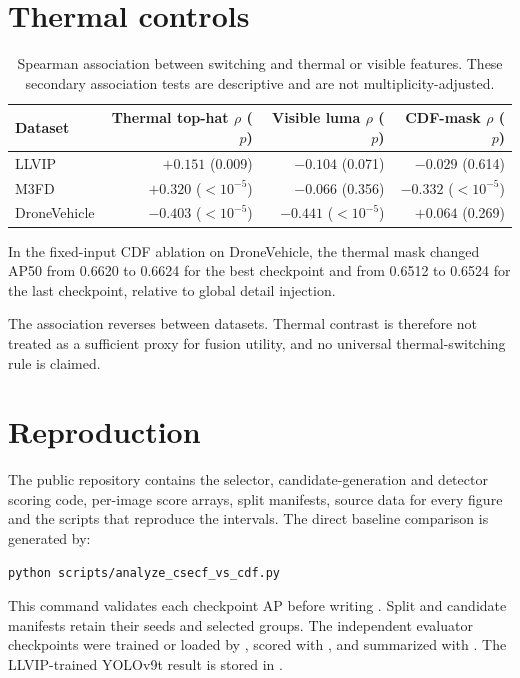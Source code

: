 \documentclass[11pt]{article}
\begin{document}
\section{Thermal controls}

\begin{table}[h]
\centering
\small
\caption{Spearman association between switching and thermal or visible
features. These secondary association tests are descriptive and are not
multiplicity-adjusted.}
\begin{tabular}{@{}lrrr@{}}
\toprule
Dataset & Thermal top-hat \(\rho\) (\(p\)) & Visible luma \(\rho\) (\(p\)) &
CDF-mask \(\rho\) (\(p\)) \\
\midrule
LLVIP & \(+0.151\) (0.009) & \(-0.104\) (0.071) & \(-0.029\) (0.614) \\
M3FD & \(+0.320\) (\(<10^{-5}\)) & \(-0.066\) (0.356) & \(-0.332\) (\(<10^{-5}\)) \\
DroneVehicle & \(-0.403\) (\(<10^{-5}\)) & \(-0.441\) (\(<10^{-5}\)) & \(+0.064\) (0.269) \\
\bottomrule
\end{tabular}
\end{table}

\noindent In the fixed-input CDF ablation on DroneVehicle, the thermal mask
changed AP50 from 0.6620 to 0.6624 for the best checkpoint and from 0.6512 to
0.6524 for the last checkpoint, relative to global detail injection.

The association reverses between datasets. Thermal contrast is therefore not
treated as a sufficient proxy for fusion utility, and no universal
thermal-switching rule is claimed.

\section{Reproduction}

The public repository contains the selector, candidate-generation and detector
scoring code, per-image score arrays, split manifests, source data for every
figure and the scripts that reproduce the intervals. The direct baseline
comparison is generated by:

\begin{verbatim}
python scripts/analyze_csecf_vs_cdf.py
\end{verbatim}

This command validates each checkpoint AP before writing
. Split and candidate
manifests retain their seeds and selected groups. The independent evaluator
checkpoints were trained or loaded by
, scored with
, and summarized with
. The LLVIP-trained YOLOv9t
result is stored in
.
\end{document}
